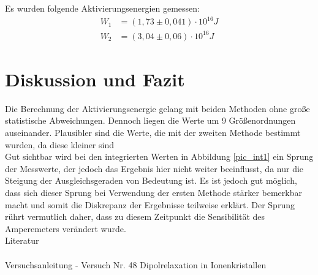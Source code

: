 Es wurden folgende Aktivierungsenergien gemessen:
\begin{align}
W_1&=(1,73    \pm 0,041)\cdot 10^{16} J\\
W_2&=(3,04	\pm 0,06)\cdot 10^{16}J
\end{align}

\section{Diskussion und Fazit}
Die Berechnung der Aktivierungsenergie gelang mit beiden Methoden ohne große statistische Abweichungen. Dennoch liegen die Werte um 9 Größenordnungen auseinander. Plausibler sind die Werte, die mit der zweiten Methode bestimmt wurden, da diese kleiner sind\\
Gut sichtbar wird bei den integrierten Werten in Abbildung \ref{pic_int1} ein Sprung der Messwerte, der jedoch das Ergebnis hier nicht weiter beeinflusst, da nur die Steigung der Ausgleichsgeraden von Bedeutung ist. Es ist jedoch gut möglich, dass sich dieser Sprung bei Verwendung der ersten Methode stärker bemerkbar macht und somit die Diskrepanz der Ergebnisse teilweise erklärt. Der Sprung rührt vermutlich daher, dass zu diesem Zeitpunkt die Sensibilität des Amperemeters verändert wurde.\\


\parskip 340pt
\Large{Literatur}\\\\
Versuchsanleitung - Versuch Nr. 48 Dipolrelaxation in Ionenkristallen





